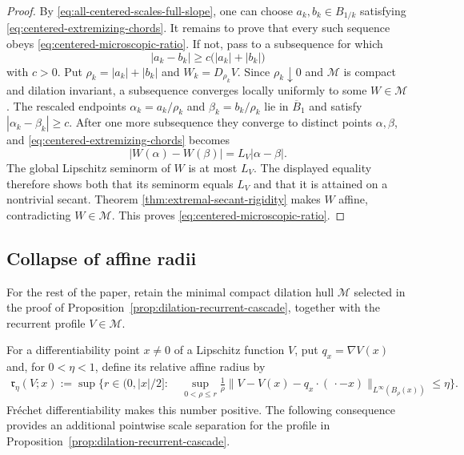 \documentclass[11pt,reqno]{amsart}
\numberwithin{equation}{section}
\theoremstyle{remark}
\begin{document}
\begin{proof}
By \eqref{eq:all-centered-scales-full-slope}, one can choose
$a_k,b_k\in B_{1/k}$ satisfying
\eqref{eq:centered-extremizing-chords}.  It remains to prove that every
such sequence obeys \eqref{eq:centered-microscopic-ratio}.  If not, pass to
a subsequence for which
\[
 |a_k-b_k|\ge c\bigl(|a_k|+|b_k|\bigr)
\]
with $c>0$.  Put $\rho_k=|a_k|+|b_k|$ and
$W_k=D_{\rho_k}V$.  Since $\rho_k\downarrow0$ and $\mathscr M$ is compact
and dilation invariant, a subsequence converges locally uniformly to some
$W\in\mathscr M$.  The rescaled endpoints
$\alpha_k=a_k/\rho_k$ and $\beta_k=b_k/\rho_k$ lie in $\overline B_1$ and
satisfy $|\alpha_k-\beta_k|\ge c$.  After one more subsequence they converge
to distinct points $\alpha,\beta$, and
\eqref{eq:centered-extremizing-chords} becomes
\[
 |W(\alpha)-W(\beta)|=L_V|\alpha-\beta|.
\]
The global Lipschitz seminorm of $W$ is at most $L_V$.  The displayed
equality therefore shows both that its seminorm equals $L_V$ and that it is
attained on a nontrivial secant.  Theorem
\ref{thm:extremal-secant-rigidity} makes $W$ affine, contradicting
$W\in\mathscr M$.  This proves \eqref{eq:centered-microscopic-ratio}.
\end{proof}

\subsection{Collapse of affine radii}
\label{subsec:collapse-affine-radii}

For the rest of the paper, retain the minimal compact dilation hull
$\mathscr M$ selected in the proof of
Proposition~\ref{prop:dilation-recurrent-cascade}, together with the recurrent
profile $V\in\mathscr M$.

For a differentiability point $x\ne0$ of a Lipschitz function $V$, put
$q_x=\nabla V(x)$ and, for $0<\eta<1$, define its relative affine radius by
\begin{equation}
\begin{split}
 \mathfrak r_\eta(V;x):=\sup\biggl\{r\in(0,|x|/2]:\ &
 \sup_{0<\rho\le r}\frac1\rho
 \|V-V(x)-q_x\cdot(\,\cdot-x)\|_{L^\infty(B_\rho(x))}
 \le\eta\biggr\}.
\end{split}
 \label{eq:relative-affine-radius}
\end{equation}
Fr\'echet differentiability makes this number positive.  The following
consequence provides an additional pointwise scale separation for the
profile in Proposition~\ref{prop:dilation-recurrent-cascade}.
\end{document}
